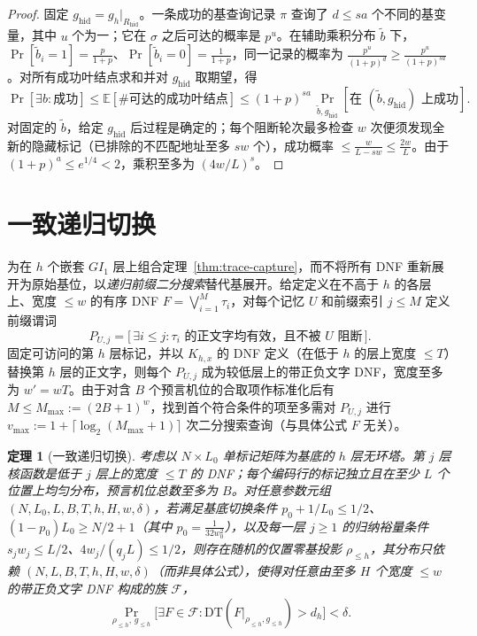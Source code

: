 \documentclass[11pt,a4paper]{article}
\newtheorem{theorem}{定理}[section]
\theoremstyle{definition}
\theoremstyle{remark}
\newcommand{\DT}{\mathrm{DT}}
\newcommand{\E}{\mathbb{E}}
\newcommand{\Prb}{\Pr}
\newcommand{\GI}{GI_1}
\begin{document}
\begin{proof}
固定 $g_{\mathrm{hid}}=g_h|_{R_{\mathrm{hid}}}$。一条成功的基查询记录 $\pi$ 查询了 $d\le sa$ 个不同的基变量，其中 $u$ 个为一；它在 $\sigma$ 之后可达的概率是 $p^u$。在辅助乘积分布 $\tilde b$ 下，$\Prb[\tilde b_i=1]=\frac p{1+p}$、$\Prb[\tilde b_i=0]=\frac1{1+p}$，同一记录的概率为 $\frac{p^u}{(1+p)^d}\ge\frac{p^u}{(1+p)^{sa}}$。对所有成功叶结点求和并对 $g_{\mathrm{hid}}$ 取期望，得
\[
  \Prb[\exists b : \text{成功}] \le \E[\#\text{可达的成功叶结点}]
  \le (1+p)^{sa}\, \Prb_{\tilde{b}, g_{\mathrm{hid}}}[\text{在 }(\tilde{b}, g_{\mathrm{hid}})\text{ 上成功}].
\]
对固定的 $\tilde b$，给定 $g_{\mathrm{hid}}$ 后过程是确定的；每个阻断轮次最多检查 $w$ 次便须发现全新的隐藏标记（已排除的不匹配地址至多 $sw$ 个），成功概率 $\le\frac w{L-sw}\le\frac{2w}{L}$。由于 $(1+p)^a\le e^{1/4}<2$，乘积至多为 $(4w/L)^s$。
\end{proof}

\section{一致递归切换}

为在 $h$ 个嵌套 $\GI$ 层上组合定理~\ref{thm:trace-capture}，而不将所有 DNF 重新展开为原始基位，以\emph{递归前缀二分搜索}替代基展开。给定定义在不高于 $h$ 的各层上、宽度 $\le w$ 的有序 DNF $F=\bigvee_{i=1}^M\tau_i$，对每个记忆 $U$ 和前缀索引 $j\le M$ 定义前缀谓词
\[
  P_{U,j} = \bigl[\,\exists i \le j : \tau_i \text{ 的正文字均有效，且不被 } U\text{ 阻断}\,\bigr].
\]
固定可访问的第 $h$ 层标记，并以 $K_{h,x}$ 的 DNF 定义（在低于 $h$ 的层上宽度 $\le T$）替换第 $h$ 层的正文字，则每个 $P_{U,j}$ 成为较低层上的带正负文字 DNF，宽度至多为 $w'=wT$。由于对含 $B$ 个预言机位的合取项作标准化后有 $M\le M_{\max}:=(2B+1)^w$，找到首个符合条件的项至多需对 $P_{U,j}$ 进行 $v_{\max}:=1+\lceil\log_2(M_{\max}+1)\rceil$ 次二分搜索查询（与具体公式 $F$ 无关）。

\begin{theorem}[一致递归切换]
\label{thm:recursive-switching}
考虑以 $N\times L_0$ 单标记矩阵为基底的 $h$ 层无环塔。第 $j$ 层核函数是低于 $j$ 层上的宽度 $\le T$ 的 DNF；每个编码行的标记独立且在至少 $L$ 个位置上均匀分布，预言机位总数至多为 $B$。对任意参数元组 $(N,L_0,L,B,T,h,H,w,\delta)$，若满足基底切换条件 $p_0+1/L_0\le1/2$、$(1-p_0)L_0\ge N/2+1$（其中 $p_0=\frac1{32w_0^2}$），以及每一层 $j\ge1$ 的归纳裕量条件 $s_jw_j\le L/2$、$4w_j/(q_jL)\le1/2$，则存在随机的仅置零基投影 $\rho_{\le h}$，其分布\emph{只}依赖 $(N,L,B,T,h,H,w,\delta)$（而非具体公式），使得对任意由至多 $H$ 个宽度 $\le w$ 的带正负文字 DNF 构成的族 $\mathcal F$，
\[
  \Prb_{\rho_{\le h},\, g_{\le h}}\bigl[\exists F \in \mathcal{F} : \DT(F|_{\rho_{\le h}, g_{\le h}}) > d_h\bigr] < \delta.
\]
\end{theorem}
\end{document}
